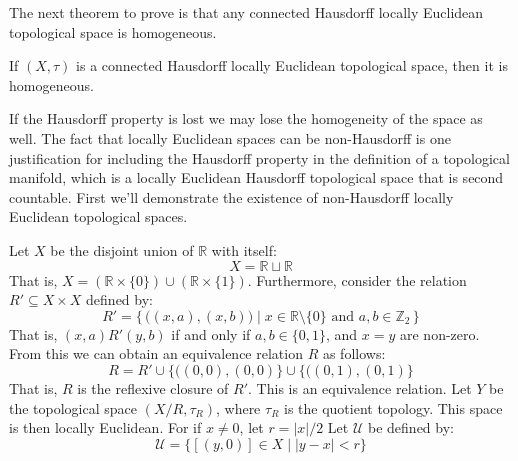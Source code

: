         The next theorem to prove is that any connected Hausdorff locally
        Euclidean topological space is homogeneous.
        \begin{theorem}
                If $(X,\tau)$ is a connected Hausdorff locally Euclidean
                topological space, then it is homogeneous.
        \end{theorem}
        If the Hausdorff property is lost we may lose the homogeneity of the
        space as well. The fact that locally Euclidean spaces can be
        non-Hausdorff is one justification for including the Hausdorff
        property in the definition of a topological manifold, which is a
        locally Euclidean Hausdorff topological space that is second
        countable. First we'll demonstrate the existence of non-Hausdorff
        locally Euclidean topological spaces.
        \begin{example}
                Let $X$ be the disjoint union of $\mathbb{R}$ with itself:
                \begin{equation}
                    X=\mathbb{R}\sqcup\mathbb{R}
                \end{equation}
                That is, $X=(\mathbb{R}\times\{0\})\cup(\mathbb{R}\times\{1\})$.
                Furthermore, consider the relation $R'\subseteq{X}\times{X}$
                defined by:
                \begin{equation}
                    R'=\Big\{\,\Big((x,a),(x,b)\Big)\;\Big|\;
                        x\in\mathbb{R}\setminus\{0\}
                        \textrm{ and }a,b\in\mathbb{Z}_{2}\,\Big\}
                \end{equation}
                That is, $(x,a)R'(y,b)$ if and only if $a,b\in\{0,1\}$, and
                $x=y$ are non-zero. From this we can obtain an equivalence
                relation $R$ as follows:
                \begin{equation}
                    R=R'\cup\big\{\big((0,0),(0,0)\big\}\cup
                        \big\{\big((0,1),(0,1)\big\}
                \end{equation}
                That is, $R$ is the reflexive closure of $R'$. This is an
                equivalence relation. Let $Y$ be the topological space
                $(X/R,\tau_{R})$, where $\tau_{R}$ is the quotient topology.
                This space is then locally Euclidean. For if $x\ne{0}$, let
                $r=|x|/2$ Let $\mathcal{U}$ be defined by:
                \begin{equation}
                    \mathcal{U}=\big\{[(y,0)]\in{X}\;|\;|y-x|<r\big\}

\end{equation}
\end{example}
